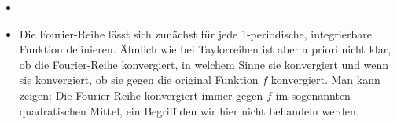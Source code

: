 \begin{Bemerkung}{
	\begin{itemize}
	\item[ ]
		\item Die Fourier-Reihe lässt sich zunächst für jede 1-periodische, 
		integrierbare Funktion definieren.
		Ähnlich wie bei Taylorreihen ist aber a priori nicht klar, ob die 
		Fourier-Reihe konvergiert, in welchem Sinne sie konvergiert und wenn sie 
		konvergiert, ob sie gegen die original Funktion $f$ konvergiert.
		Man kann zeigen: Die Fourier-Reihe konvergiert immer gegen $f$ im 
		sogenannten \glqq quadratischen Mittel\grqq{}, ein Begriff den wir hier 
		nicht behandeln werden.
	\end{itemize}
}\end{Bemerkung}